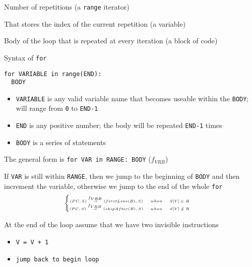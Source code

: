 \documentclass{beamer}
\begin{document}
\begin{slide}{
\item Number of repetitions (a \texttt{range} iterator)
\item That stores the index of the current repetition (a variable)
\item Body of the loop that is repeated at every iteration (a block of code)
}\end{slide}

\begin{frame}[fragile]{Syntax of \texttt{for}}
\begin{lstlisting}
for VARIABLE in range(END):
  BODY
\end{lstlisting}

\begin{itemize}
\item \texttt{VARIABLE} is any valid variable name that becomes useable within the \texttt{BODY}; will range from \texttt{0} to \texttt{END-1}
\item \texttt{END} is any positive number; the body will be repeated \texttt{END-1} times
\item \texttt{BODY} is a series of statements
\end{itemize}
\end{frame}

\begin{slide}{
\item The general form is \texttt{for VAR in RANGE: BODY} ($f_{VRB}$)
\item If \texttt{VAR} is still within \texttt{RANGE}, then we jump to the beginning of \texttt{BODY} and then increment the variable, otherwise we jump to the end of the whole \texttt{for}
$$
\tiny
\left\{
\begin{matrix}
(PC,S) \overset{f_{VRB}}{\rightarrow} (firstLine(B),S) &when& S[V] \in R & \\
(PC,S) \overset{f_{VRB}}{\rightarrow} (skipAfter(B),S) &when& S[V] \notin R & \\
\end{matrix}
\right.
$$
\item At the end of the loop assume that we have two invisible instructions
\begin{itemize}
\item \texttt{V = V + 1}
\item \texttt{jump back to begin loop}
\end{itemize}
}\end{slide}
\end{document}
